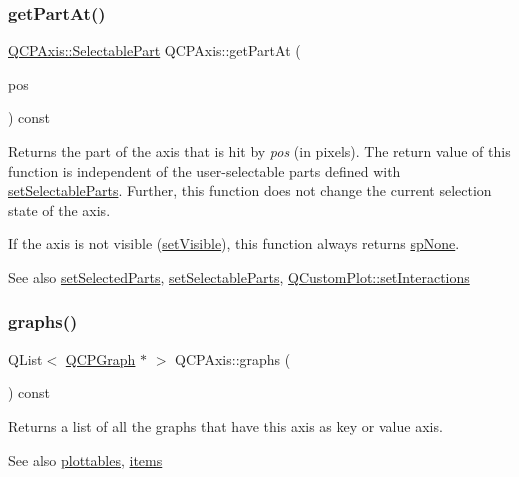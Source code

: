 \subsubsection{\texorpdfstring{get\+Part\+At()}{getPartAt()}}
{\footnotesize\ttfamily \hyperlink{classQCPAxis_abee4c7a54c468b1385dfce2c898b115f}{Q\+C\+P\+Axis\+::\+Selectable\+Part} Q\+C\+P\+Axis\+::get\+Part\+At (\begin{DoxyParamCaption}\item[{const Q\+PointF \&}]{pos }\end{DoxyParamCaption}) const}

Returns the part of the axis that is hit by {\itshape pos} (in pixels). The return value of this function is independent of the user-\/selectable parts defined with \hyperlink{classQCPAxis_a513f9b9e326c505d9bec54880031b085}{set\+Selectable\+Parts}. Further, this function does not change the current selection state of the axis.

If the axis is not visible (\hyperlink{classQCPLayerable_a3bed99ddc396b48ce3ebfdc0418744f8}{set\+Visible}), this function always returns \hyperlink{classQCPAxis_abee4c7a54c468b1385dfce2c898b115fae0df8123a5528d5ccf87cb7794f971ea}{sp\+None}.

\begin{DoxySeeAlso}{See also}
\hyperlink{classQCPAxis_ab9d7a69277dcbed9119b3c1f25ca19c3}{set\+Selected\+Parts}, \hyperlink{classQCPAxis_a513f9b9e326c505d9bec54880031b085}{set\+Selectable\+Parts}, \hyperlink{classQCustomPlot_a5ee1e2f6ae27419deca53e75907c27e5}{Q\+Custom\+Plot\+::set\+Interactions} 
\end{DoxySeeAlso}
\mbox{\label{classQCPAxis_ad590c0da223697a2727f97a520870fec}} 
\subsubsection{\texorpdfstring{graphs()}{graphs()}}
{\footnotesize\ttfamily Q\+List$<$ \hyperlink{classQCPGraph}{Q\+C\+P\+Graph} $\ast$ $>$ Q\+C\+P\+Axis\+::graphs (\begin{DoxyParamCaption}{ }\end{DoxyParamCaption}) const}

Returns a list of all the graphs that have this axis as key or value axis.

\begin{DoxySeeAlso}{See also}
\hyperlink{classQCPAxis_ac5e0f6f65c75efb5fd32275d6e4ef0d6}{plottables}, \hyperlink{classQCPAxis_a42761bc68e2f3a9f68549d45b73f705b}{items} 
\end{DoxySeeAlso}
\mbox{\label{classQCPAxis_a63f1dd2df663680d2a8d06c19592dd63}} 
